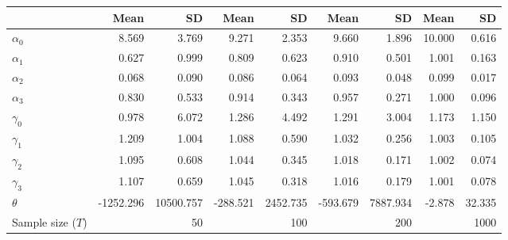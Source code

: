 
\begin{tabular}[t]{lrrrrrrrr}
\toprule
  & Mean & SD & Mean  & SD  & Mean   & SD   & Mean    & SD   \\
\midrule
$\alpha_{0}$ & 8.569 & 3.769 & 9.271 & 2.353 & 9.660 & 1.896 & 10.000 & 0.616\\
$\alpha_{1}$ & 0.627 & 0.999 & 0.809 & 0.623 & 0.910 & 0.501 & 1.001 & 0.163\\
$\alpha_{2}$ & 0.068 & 0.090 & 0.086 & 0.064 & 0.093 & 0.048 & 0.099 & 0.017\\
$\alpha_{3}$ & 0.830 & 0.533 & 0.914 & 0.343 & 0.957 & 0.271 & 1.000 & 0.096\\
$\gamma_{0}$ & 0.978 & 6.072 & 1.286 & 4.492 & 1.291 & 3.004 & 1.173 & 1.150\\
$\gamma_{1}$ & 1.209 & 1.004 & 1.088 & 0.590 & 1.032 & 0.256 & 1.003 & 0.105\\
$\gamma_{2}$ & 1.095 & 0.608 & 1.044 & 0.345 & 1.018 & 0.171 & 1.002 & 0.074\\
$\gamma_{3}$ & 1.107 & 0.659 & 1.045 & 0.318 & 1.016 & 0.179 & 1.001 & 0.078\\
$\theta$ & -1252.296 & 10500.757 & -288.521 & 2452.735 & -593.679 & 7887.934 & -2.878 & 32.335\\
Sample size ($T$) &  & 50 &  & 100 &  & 200 &  & 1000\\
\bottomrule
\end{tabular}
